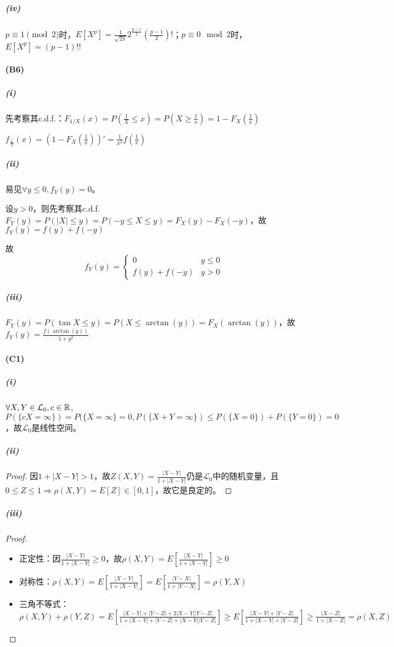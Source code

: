 \documentclass{ctexart}
\begin{document}
\subparagraph{(iv)}
$p\equiv 1\pmod{2}$时，$E[X^{p}]=\frac{1}{\sqrt{2\pi}}2^{\frac{p-1}{2}}(\frac{p-1}{2})!$；$p\equiv 0\mod 2$时，$E[X^{p}]=(p-1)!!$

\paragraph{(B6)}
\subparagraph{(i)}
先考察其c.d.f.：$F_{1/X}(x)=P(\frac{1}{X}\leq x)=P(X\geq \frac{1}{x})=1-F_{X}(\frac{1}{x})$

$f_{\frac{1}{X}}(x)=(1-F_{X}(\frac{1}{x}))'=\frac{1}{x^{2}}f(\frac{1}{x})$

\subparagraph{(ii)}
易见$\forall y\leq 0, f_{Y}(y)=0$。

设$y>0$，则先考察其c.d.f.$F_{Y}(y)=P(|X|\leq y)=P(-y\leq X\leq y)=F_{X}(y)-F_{X}(-y)$，故$f_{Y}(y)=f(y)+f(-y)$

故
\[f_{Y}(y)=
  \begin{cases}
    0& y\leq 0\\
    f(y)+f(-y)& y>0
  \end{cases}
\]
\subparagraph{(iii)}
$F_{Y}(y)=P(\tan X\leq y)=P(X\leq \arctan(y))=F_{X}(\arctan(y))$，故$f_{Y}(y)=\frac{f(\arctan(y))}{1+y^{2}}$

\renewcommand{\L}{\mathcal{L}}

\paragraph{(C1)}
\subparagraph{(i)}
$\forall X,Y\in \L_{0}, c\in\R$, $P(\{cX=\infty\})=P(\{X=\infty\}=0, P(\{X+Y=\infty\})\leq P(\{X=0\})+P(\{Y=0\})=0$，故$\L_{0}$是线性空间。
\subparagraph{(ii)}
\begin{proof}
  因$1+|X-Y|>1$，故$Z(X,Y)=\frac{|X-Y|}{1+|X-Y|}$仍是$\L_{0}$中的随机变量，且$0\leq Z\leq 1\Rightarrow \rho(X,Y)=E[Z]\in [0,1]$，故它是良定的。
\end{proof}

\subparagraph{(iii)}
\begin{proof}
  \begin{itemize}
  \item 正定性：因$\frac{|X-Y|}{1+|X-Y|}\geq 0$，故$\rho(X,Y)=E[\frac{|X-Y|}{1+|X-Y|}]\geq 0$
  \item 对称性：$\rho(X,Y)=E[\frac{|X-Y|}{1+|X-Y|}]=E[\frac{|Y-X|}{1+|Y-X|}]=\rho(Y,X)$
  \item 三角不等式：$\rho(X,Y)+\rho(Y,Z)=E[\frac{|X-Y|+|Y-Z|+2|X-Y||Y-Z|}{1+|X-Y|+|Y-Z|+|X-Y||Y-Z|}]\geq E[\frac{|X-Y|+|Y-Z|}{1+|X-Y|+|Y-Z|}]\geq \frac{|X-Z|}{1+|X-Z|}=\rho(X,Z)$
  \end{itemize}
\end{proof}
\end{document}
